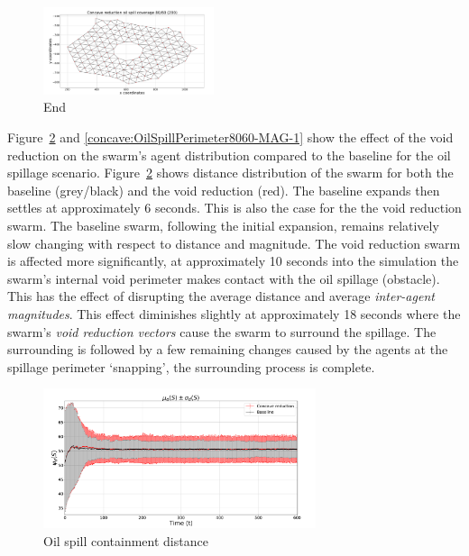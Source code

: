 \documentclass[preprint,12pt]{elsarticle}
\begin{document}
\begin{figure}
\begin{center}
\includegraphics[width=5cm]{figures/OilSpillConcave3}
\end{center}
\caption{End\label{concave:OilSpillConcave3}}
\end{figure}
Figure~\ref{concave:OilSpillPerimeter8060-DIST-1} and \ref{concave:OilSpillPerimeter8060-MAG-1} show the effect of the void reduction on the swarm's agent distribution compared to the baseline for the oil spillage scenario. 
Figure~\ref{concave:OilSpillPerimeter8060-DIST-1} shows distance distribution of the swarm for both the baseline (grey/black) and the void reduction (red). The baseline expands then settles at approximately 6 seconds. This is also the case for the the void reduction swarm. The baseline swarm, following the initial expansion, remains relatively slow changing with respect to distance and magnitude. The void reduction swarm is affected more significantly, at approximately 10 seconds into the simulation the swarm's internal void perimeter makes contact with the oil spillage (obstacle). This has the effect of disrupting the average distance and average \textit{inter-agent magnitudes}. This effect diminishes slightly at approximately 18 seconds where the swarm's \textit{void reduction vectors} cause the swarm to surround the spillage. The surrounding is followed by a few remaining changes caused by the agents at the spillage perimeter `snapping', the surrounding process is complete.
\begin{figure}
\begin{center}
\includegraphics[width=8cm]{figures/OilSpillPerimeter8060-DIST-1}
\end{center}
\caption{Oil spill containment distance\label{concave:OilSpillPerimeter8060-DIST-1}}
\end{figure}
\end{document}
